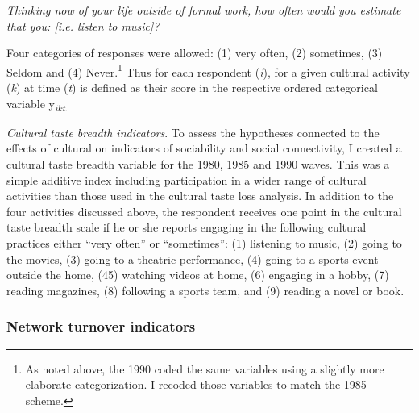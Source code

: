 \emph{Thinking now of your life outside of formal work, how often would you estimate that you: {[}i.e. listen to music{]}?}

Four categories of responses were allowed: (1) very often, (2) sometimes, (3) Seldom and (4) Never.\footnote{As noted above, the 1990 coded the same variables using a slightly more elaborate categorization. I recoded those variables to match the 1985 scheme.} Thus for each respondent (\emph{i}), for a given cultural activity (\emph{k}) at time (\emph{t}) is defined as their score in the respective ordered categorical variable y\textsubscript{\emph{ikt}.}

\emph{Cultural taste breadth indicators}. To assess the hypotheses connected to the effects of cultural on indicators of sociability and social connectivity, I created a cultural taste breadth variable for the 1980, 1985 and 1990 waves. This was a simple additive index including participation in a wider range of cultural activities than those used in the cultural taste loss analysis. In addition to the four activities discussed above, the respondent receives one point in the cultural taste breadth scale if he or she reports engaging in the following cultural practices either ``very often'' or ``sometimes'': (1) listening to music, (2) going to the movies, (3) going to a theatric performance, (4) going to a sports event outside the home, (45) watching videos at home, (6) engaging in a hobby, (7) reading magazines, (8) following a sports team, and (9) reading a novel or book.

\subsubsection{Network turnover indicators}\label{network-turnover-indicators}

